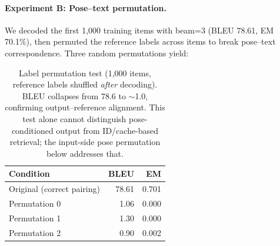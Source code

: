 \documentclass[pdflatex,sn-chicago]{sn-jnl}
\begin{document}
\paragraph{Experiment B: Pose--text permutation.}
We decoded the first 1{,}000 training items with beam=3 (BLEU 78.61, EM 70.1\%), then permuted the reference labels across items to break pose--text correspondence. Three random permutations yield:
\begin{table}[h]
\centering
\small
\caption{Label permutation test (1{,}000 items, reference labels shuffled \emph{after} decoding). BLEU collapses from 78.6 to $\sim$1.0, confirming output--reference alignment. This test alone cannot distinguish pose-conditioned output from ID/cache-based retrieval; the input-side pose permutation below addresses that.}
\label{tab:permutation_test}
\begin{tabular}{lrr}
\toprule
Condition & BLEU & EM \\
\midrule
Original (correct pairing) & 78.61 & 0.701 \\
Permutation 0 & 1.06 & 0.000 \\
Permutation 1 & 1.30 & 0.000 \\
Permutation 2 & 0.90 & 0.002 \\
\bottomrule
\end{tabular}
\end{table}
\end{document}
